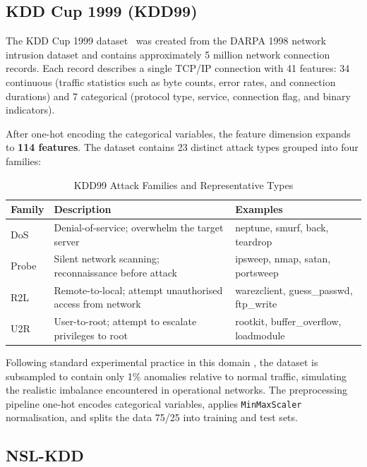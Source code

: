 \documentclass[12pt,a4paper]{article}
\begin{document}
\subsection{KDD Cup 1999 (KDD99)}

The KDD Cup 1999 dataset~\citep{tavallaee2009detailed} was created from the
DARPA 1998 network intrusion dataset and contains approximately 5 million
network connection records. Each record describes a single TCP/IP connection
with 41 features: 34 continuous (traffic statistics such as byte counts, error
rates, and connection durations) and 7 categorical (protocol type, service,
connection flag, and binary indicators).

After one-hot encoding the categorical variables, the feature dimension expands
to \textbf{114 features}. The dataset contains 23 distinct attack types grouped
into four families:

\begin{table}[h!]
\centering
\caption{KDD99 Attack Families and Representative Types}
\begin{tabularx}{\textwidth}{lXl}
\toprule
\textbf{Family} & \textbf{Description} & \textbf{Examples} \\
\midrule
DoS   & Denial-of-service; overwhelm the target server
       & neptune, smurf, back, teardrop \\
Probe & Silent network scanning; reconnaissance before attack
       & ipsweep, nmap, satan, portsweep \\
R2L   & Remote-to-local; attempt unauthorised access from network
       & warezclient, guess\_passwd, ftp\_write \\
U2R   & User-to-root; attempt to escalate privileges to root
       & rootkit, buffer\_overflow, loadmodule \\
\bottomrule
\end{tabularx}
\end{table}

\noindent
Following standard experimental practice in this domain \citep{ae_analysis_nids,alad},
the dataset is subsampled to contain only 1\% anomalies relative to normal traffic,
simulating the realistic imbalance encountered in operational networks.
The preprocessing pipeline one-hot encodes categorical variables, applies
\texttt{MinMaxScaler} normalisation, and splits the data 75/25 into training
and test sets.

\subsection{NSL-KDD}
\end{document}
